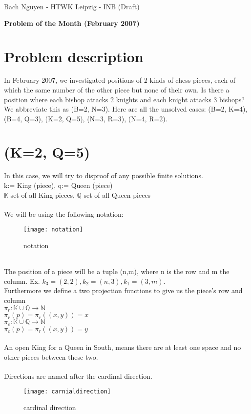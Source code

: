 \documentclass[a4paper,oneside]{scrarticle}
\begin{document}
	\begin{flushleft}
		Bach Nguyen - HTWK Leipzig - INB (Draft)
	\end{flushleft}
	\begin{center}
		\begin{LARGE}
			\textbf{Problem of the Month (February 2007)}
		\end{LARGE}
	\end{center}
	\section*{Problem description}
	In February 2007, we investigated positions of 2 kinds of chess pieces, each of which the same number of the other piece but none of their own. Is there a position where each bishop attacks 2 knights and each knight attacks 3 bishops? We abbreviate this as (B=2, N=3). Here are all the unsolved cases: (B=2, K=4), (B=4, Q=3), (K=2, Q=5), (N=3, R=3), (N=4, R=2).
	\section*{(K=2, Q=5)}
	In this case, we will try to disproof of any possible finite solutions.\\
	k:= King (piece), q:= Queen (piece)\\
	$\mathbb{K}$ set of all King pieces, $\mathbb{Q}$ set of all Queen pieces\\
	\\
	We will be using the following notation:\\
	\begin{figure}[h]
		\centering
		\texttt{[image: notation]}
		\caption{notation}
		\label{fig:notation}
	\end{figure}
	\\
	The position of a piece will be a tuple (n,m), where n is the row and m the column. Ex. $k_3 = (2,2), k_2 = (n,3), k_1 = (3,m)$.\\
	Furthermore we define a two projection functions to give us the piece's row and column\\
	$\pi_r:\mathbb{K}\cup\mathbb{Q}\rightarrow\mathbb{N}$\\
	$\pi_r(p) = \pi_r((x,y)) = x$\\
	$\pi_c:\mathbb{K}\cup\mathbb{Q}\rightarrow\mathbb{N}$\\
	$\pi_c(p) = \pi_r((x,y)) = y$\\
	\\
	An open King for a Queen in South, means there are at least one space and no other pieces between these two.\\
	\\
	Directions are named after the cardinal direction.\\
	\begin{figure}[h]
		\centering
		\texttt{[image: carnialdirection]}
		\caption{cardinal direction}
		\label{fig:carnialdirection}
	\end{figure}
	
\end{document}
